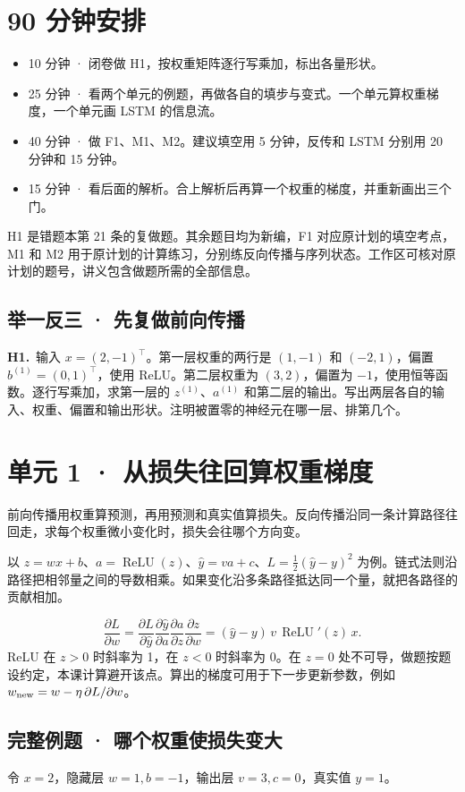 \documentclass[UTF8,a4paper,11pt]{ctexart}
\newcommand{\CompactQuestion}[2]{\par\noindent\textbf{#1.}\ #2\par\vspace{.8em}}
\begin{document}
\section{90 分钟安排}
\begin{itemize}
\item 10 分钟 · 闭卷做 H1，按权重矩阵逐行写乘加，标出各量形状。
\item 25 分钟 · 看两个单元的例题，再做各自的填步与变式。一个单元算权重梯度，一个单元画 LSTM 的信息流。
\item 40 分钟 · 做 F1、M1、M2。建议填空用 5 分钟，反传和 LSTM 分别用 20 分钟和 15 分钟。
\item 15 分钟 · 看后面的解析。合上解析后再算一个权重的梯度，并重新画出三个门。
\end{itemize}
H1 是错题本第 21 条的复做题。其余题目均为新编，F1 对应原计划的填空考点，M1 和 M2 用于原计划的计算练习，分别练反向传播与序列状态。工作区可核对原计划的题号，讲义包含做题所需的全部信息。

\subsection{举一反三 · 先复做前向传播}
\CompactQuestion{H1}{输入 $x=(2,-1)^\top$。第一层权重的两行是 $(1,-1)$ 和 $(-2,1)$，偏置 $b^{(1)}=(0,1)^\top$，使用 ReLU。第二层权重为 $(3,2)$，偏置为 $-1$，使用恒等函数。逐行写乘加，求第一层的 $z^{(1)}$、$a^{(1)}$ 和第二层的输出。写出两层各自的输入、权重、偏置和输出形状。注明被置零的神经元在哪一层、排第几个。}
\clearpage
\section{单元 1 · 从损失往回算权重梯度}
前向传播用权重算预测，再用预测和真实值算损失。反向传播沿同一条计算路径往回走，求每个权重微小变化时，损失会往哪个方向变。

以 $z=wx+b$、$a=\operatorname{ReLU}(z)$、$\hat y=va+c$、$L=\tfrac12(\hat y-y)^2$ 为例。链式法则沿路径把相邻量之间的导数相乘。如果变化沿多条路径抵达同一个量，就把各路径的贡献相加。

\[\frac{\partial L}{\partial w}=\frac{\partial L}{\partial\hat y}\frac{\partial\hat y}{\partial a}\frac{\partial a}{\partial z}\frac{\partial z}{\partial w}=(\hat y-y)\,v\,\operatorname{ReLU}'(z)\,x.\]
ReLU 在 $z>0$ 时斜率为 1，在 $z<0$ 时斜率为 0。在 $z=0$ 处不可导，做题按题设约定，本课计算避开该点。算出的梯度可用于下一步更新参数，例如 $w_{\rm new}=w-\eta\,\partial L/\partial w$。

\subsection{完整例题 · 哪个权重使损失变大}
令 $x=2$，隐藏层 $w=1,b=-1$，输出层 $v=3,c=0$，真实值 $y=1$。
\end{document}
